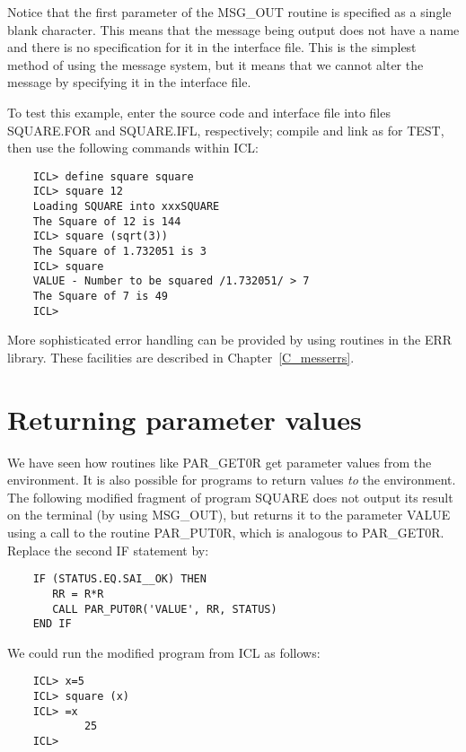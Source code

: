 Notice that the first parameter of the MSG\_OUT routine is specified as
a single blank character.
This means that the message being output does not have a name and there is
no specification for it in the interface file.
This is the simplest method of using the message system, but it means that
we cannot alter the message by specifying it in the interface file.

To test this example, enter the source code and interface file into files
SQUARE.FOR and SQUARE.IFL, respectively; compile and link as for TEST, then
use the following commands within ICL:

\begin{small}
\begin{verbatim}
    ICL> define square square
    ICL> square 12
    Loading SQUARE into xxxSQUARE
    The Square of 12 is 144
    ICL> square (sqrt(3))
    The Square of 1.732051 is 3
    ICL> square
    VALUE - Number to be squared /1.732051/ > 7
    The Square of 7 is 49
    ICL>
\end{verbatim}
\end{small}

More sophisticated error handling can be provided by using routines in the
ERR library.
These facilities are described in Chapter~\ref{C_messerrs}.

\section{Returning parameter values}

We have seen how routines like PAR\_GET0R get parameter values from the
environment.
It is also possible for programs to return values {\em to} the environment.
The following modified fragment of program SQUARE does not output its result
on the terminal (by using MSG\_OUT), but returns it to the parameter VALUE
using a call to the routine PAR\_PUT0R, which is analogous to PAR\_GET0R.
Replace the second IF statement by:

\begin{small}
\begin{verbatim}
    IF (STATUS.EQ.SAI__OK) THEN      
       RR = R*R           
       CALL PAR_PUT0R('VALUE', RR, STATUS)
    END IF
\end{verbatim}
\end{small}
                            
We could run the modified program from ICL as follows:

\begin{small}
\begin{verbatim}
    ICL> x=5
    ICL> square (x)
    ICL> =x
            25
    ICL>
\end{verbatim}
\end{small}

